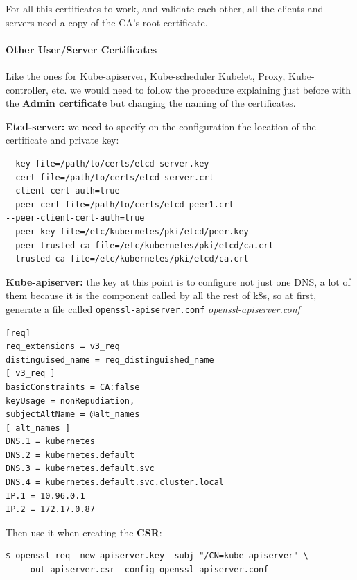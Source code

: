 \documentclass{article}
\newenvironment{blocktemplateIII}[1]{%
    \tcolorbox[beamer,%
    noparskip,breakable,
    ,colframe=Red,%
    colbacklower=LimeGreen!75!LightGreen,%
    title=#1]}%
    {\endtcolorbox}
\newenvironment{codetemplate}[1][]{%
  \mybasecolorbox[#1]
  \itshape
}{%
  \endmybasecolorbox
}
\begin{document}
\begin{blocktemplateIII}{WARNING}
For all this certificates to work, and validate each other, all the clients and servers need a copy of the CA's root certificate.
\end{blocktemplateIII}

\paragraph{Other User/Server Certificates}
Like the ones for Kube-apiserver, Kube-scheduler Kubelet, Proxy, Kube-controller, etc. we would need to follow the procedure explaining just before with the \textbf{Admin certificate} but changing the naming of the certificates.

\textbf{Etcd-server:} we need to specify on the configuration the location of the certificate and private key:
\begin{codetemplate}{}
\begin{verbatim}
--key-file=/path/to/certs/etcd-server.key
--cert-file=/path/to/certs/etcd-server.crt
--client-cert-auth=true
--peer-cert-file=/path/to/certs/etcd-peer1.crt
--peer-client-cert-auth=true
--peer-key-file=/etc/kubernetes/pki/etcd/peer.key
--peer-trusted-ca-file=/etc/kubernetes/pki/etcd/ca.crt
--trusted-ca-file=/etc/kubernetes/pki/etcd/ca.crt
\end{verbatim}
\end{codetemplate}

\textbf{Kube-apiserver:} the key at this point is to configure not just one DNS, a lot of them because it is the component called by all the rest of k8s, so at first, generate a file called \verb|openssl-apiserver.conf|
\begin{codetemplate}{openssl-apiserver.conf}
\begin{verbatim}
[req]
req_extensions = v3_req
distinguised_name = req_distinguished_name
[ v3_req ]
basicConstraints = CA:false
keyUsage = nonRepudiation,
subjectAltName = @alt_names
[ alt_names ]
DNS.1 = kubernetes
DNS.2 = kubernetes.default
DNS.3 = kubernetes.default.svc
DNS.4 = kubernetes.default.svc.cluster.local
IP.1 = 10.96.0.1
IP.2 = 172.17.0.87
\end{verbatim}
\end{codetemplate}

Then use it when creating the \textbf{CSR}:
\begin{codetemplate}{}
\begin{verbatim}
$ openssl req -new apiserver.key -subj "/CN=kube-apiserver" \
    -out apiserver.csr -config openssl-apiserver.conf
\end{verbatim}
\end{codetemplate}
\end{document}
